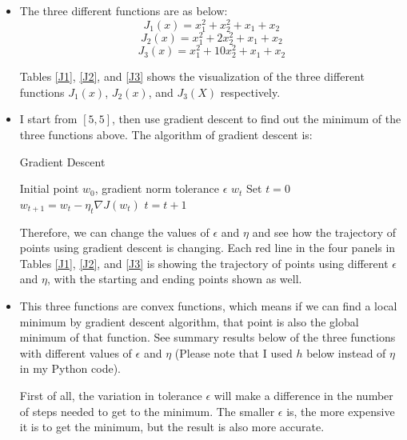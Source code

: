 \begin{itemize}
\item The three different functions are as below:
\[J_1(x)=x_1^2+x_2^2+x_1+x_2\]
\[J_2(x)=x_1^2+2x_2^2+x_1+x_2\]
\[J_3(x)=x_1^2+10x_2^2+x_1+x_2\]

Tables \ref{J1}, \ref{J2}, and \ref{J3} shows the visualization of the three different functions $J_1(x)$, $J_2(x)$, and $J_3(X)$ respectively. 

\item I start from $[5,5]$, then use gradient descent to find out the minimum of the three functions above. The algorithm of gradient descent is:\\



\begin{algorithm} %
\caption{Gradient Descent} %
\label{alg1} %
\begin{algorithmic} %
\REQUIRE Initial point $w_0$, gradient norm tolerance $\epsilon$
\ENSURE $w_t$
\STATE Set $t=0$ 
\STATE $w_{t+1}=w_t-\eta_t \nabla J(w_t)$ 
\STATE $t=t+1$
\ENDWHILE
\end{algorithmic}
\end{algorithm}
	
Therefore, we can change the values of $\epsilon$ and $\eta$ and see how the trajectory of points using gradient descent is changing. Each red line in the four panels in Tables \ref{J1}, \ref{J2}, and \ref{J3} is showing the trajectory of points using different $\epsilon$ and $\eta$, with the starting and ending points shown as well. 

\item This three functions are convex functions, which means if we can find a local minimum by gradient descent algorithm, that point is also the global minimum of that function. See summary results below of the three functions with different values of $\epsilon$ and $\eta$ (Please note that I used $h$ below instead of $\eta$ in my Python code). 

First of all, the variation in tolerance $\epsilon$ will make a difference in the number of steps needed to get to the minimum. The smaller $\epsilon$ is, the more expensive it is to get the minimum, but the result is also more accurate. 


\end{itemize}
